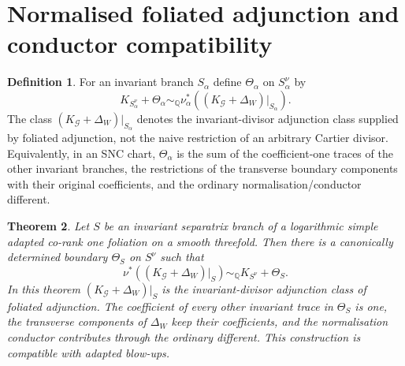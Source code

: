 \documentclass[11pt]{amsart}
\numberwithin{equation}{section}
\theoremstyle{plain}
\newtheorem{Theorem}{Theorem}[section]
\theoremstyle{definition}
\newtheorem{Definition}[Theorem]{Definition}
\newcommand{\bQ}{\mathbb Q}
\newcommand{\cG}{\mathcal G}
\begin{document}
\section{Normalised foliated adjunction and conductor compatibility}
\label{sec:adjunction}

\begin{Definition} 
For an invariant branch $S_\alpha$ define $\Theta_\alpha$ on $S_\alpha^\nu$ by
\[
K_{S_\alpha^\nu}+\Theta_\alpha
\sim_\bQ
\nu_\alpha^*((K_\cG+\Delta_W)|_{S_\alpha}).
\]
The class $(K_\cG+\Delta_W)|_{S_\alpha}$ denotes the invariant-divisor adjunction class supplied by foliated adjunction, not the naive restriction of an arbitrary Cartier divisor.
Equivalently, in an SNC chart, $\Theta_\alpha$ is the sum of the coefficient-one traces of the other invariant branches, the restrictions of the transverse boundary components with their original coefficients, and the ordinary normalisation/conductor different.
\end{Definition}

\begin{Theorem}
\label{thm:normalised-adjunction}
Let $S$ be an invariant separatrix branch of a logarithmic simple adapted co-rank one foliation on a smooth threefold.  Then there is a canonically determined boundary $\Theta_S$ on $S^\nu$ such that
\[
\nu^*((K_\cG+\Delta_W)|_S)
\sim_\bQ
K_{S^\nu}+\Theta_S.
\]
In this theorem $(K_\cG+\Delta_W)|_S$ is the invariant-divisor adjunction class of foliated adjunction.
The coefficient of every other invariant trace in $\Theta_S$ is one, the transverse components of $\Delta_W$ keep their coefficients, and the normalisation conductor contributes through the ordinary different.  This construction is compatible with adapted blow-ups.
\end{Theorem}
\end{document}

